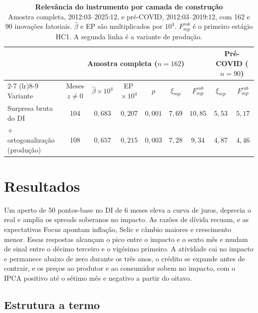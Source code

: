 \documentclass[preprint,authoryear,review,12pt]{elsarticle}
\begin{document}
\begin{table}[H]
\begin{center}
\footnotesize
\setlength{\tabcolsep}{5pt}
\begin{tabular}{@{}l c c c c c c c c@{}}
\toprule
 & \multicolumn{6}{c}{Amostra completa ($n = 162$)} & \multicolumn{2}{c}{Pré-COVID ($n = 90$)} \\
\cmidrule(lr){2-7} \cmidrule(lr){8-9}
Variante & Meses $z \neq 0$ & $\hat{\beta} \times 10^{4}$ & EP\,$\times\,10^{4}$ & $p$ & $\xi_{mp}$ & $F^{rob}_{mp}$ & $\xi_{mp}$ & $F^{rob}_{mp}$ \\
\midrule
Surpresa bruta do DI                    & 104 & $0{,}683$ & $0{,}207$ & $0{,}001$ & $7{,}69$ & $10{,}85$ & $5{,}53$ & $5{,}17$ \\
\quad + ortogonalização (produção)      & 108 & $0{,}657$ & $0{,}215$ & $0{,}003$ & $7{,}28$ & $9{,}34$  & $4{,}87$ & $4{,}46$ \\
\bottomrule
\end{tabular}
\caption{\textbf{Relevância do instrumento por camada de construção}\\{Amostra completa, 2012:03--2025:12, e pré-COVID, 2012:03--2019:12, com 162 e 90 inovações fatoriais. $\hat{\beta}$ e EP são multiplicados por $10^4$. $F^{rob}_{mp}$ é o primeiro estágio HC1. A segunda linha é a variante de produção.}}
\label{tab:first_stage}
\end{center}
\end{table}



\section{Resultados}
\label{sec:resultados}

Um aperto de 50 pontos-base no DI de 6 meses eleva a curva de juros, deprecia o real e amplia os spreads soberanos no impacto. As razões de dívida recuam, e as expectativas Focus apontam inflação, Selic e câmbio maiores e crescimento menor. Essas respostas alcançam o pico entre o impacto e o sexto mês e mudam de sinal entre o décimo terceiro e o vigésimo primeiro. A atividade cai no impacto e permanece abaixo de zero durante os três anos, o crédito se expande antes de contrair, e os preços ao produtor e ao consumidor sobem no impacto, com o IPCA positivo até o sétimo mês e negativo a partir do oitavo.

\subsection{Estrutura a termo}
\end{document}
